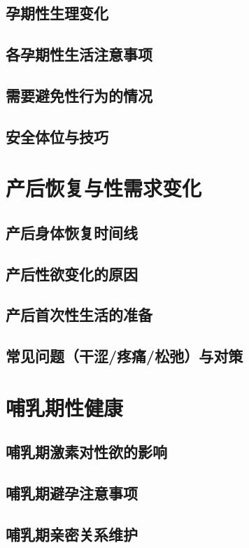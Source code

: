 \begin{enumerate}
\subsection{孕期性生理变化}
\subsection{各孕期性生活注意事项}
\subsection{需要避免性行为的情况}
\subsection{安全体位与技巧}

\section{产后恢复与性需求变化}
\subsection{产后身体恢复时间线}
\subsection{产后性欲变化的原因}
\subsection{产后首次性生活的准备}
\subsection{常见问题（干涩/疼痛/松弛）与对策}

\section{哺乳期性健康}
\subsection{哺乳期激素对性欲的影响}
\subsection{哺乳期避孕注意事项}
\subsection{哺乳期亲密关系维护}


\end{enumerate}
